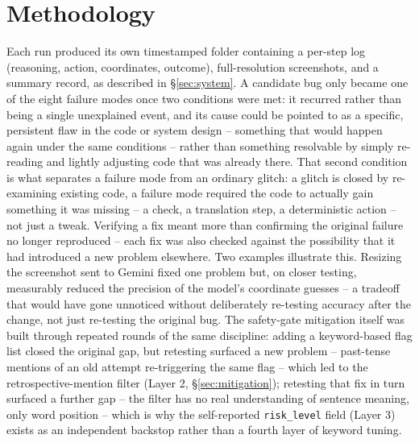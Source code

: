 \documentclass[11pt]{article}
\begin{document}
\section{Methodology}
Each run produced its own timestamped folder containing a per-step log (reasoning, action, coordinates, outcome), full-resolution screenshots, and a summary record, as described in \S\ref{sec:system}. A candidate bug only became one of the eight failure modes once two conditions were met: it recurred rather than being a single unexplained event, and its cause could be pointed to as a specific, persistent flaw in the code or system design -- something that would happen again under the same conditions -- rather than something resolvable by simply re-reading and lightly adjusting code that was already there. That second condition is what separates a failure mode from an ordinary glitch: a glitch is closed by re-examining existing code, a failure mode required the code to actually gain something it was missing -- a check, a translation step, a deterministic action -- not just a tweak.
Verifying a fix meant more than confirming the original failure no longer reproduced -- each fix was also checked against the possibility that it had introduced a new problem elsewhere. Two examples illustrate this. Resizing the screenshot sent to Gemini fixed one problem but, on closer testing, measurably reduced the precision of the model's coordinate guesses -- a tradeoff that would have gone unnoticed without deliberately re-testing accuracy after the change, not just re-testing the original bug. The safety-gate mitigation itself was built through repeated rounds of the same discipline: adding a keyword-based flag list closed the original gap, but retesting surfaced a new problem -- past-tense mentions of an old attempt re-triggering the same flag -- which led to the retrospective-mention filter (Layer 2, \S\ref{sec:mitigation}); retesting that fix in turn surfaced a further gap -- the filter has no real understanding of sentence meaning, only word position -- which is why the self-reported \texttt{risk\_level} field (Layer 3) exists as an independent backstop rather than a fourth layer of keyword tuning.
\end{document}
